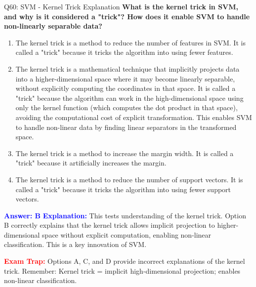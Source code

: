 \documentclass[8pt]{beamer}
\begin{document}
	\begin{frame}{Q60: SVM - Kernel Trick Explanation}
		\fontsize{6.5}{7.5}\selectfont
		\textbf{What is the kernel trick in SVM, and why is it considered a "trick"? How does it enable SVM to handle non-linearly separable data?}
		
		\begin{enumerate}
			\item The kernel trick is a method to reduce the number of features in SVM. It is called a "trick" because it tricks the algorithm into using fewer features.
			\item The kernel trick is a mathematical technique that implicitly projects data into a higher-dimensional space where it may become linearly separable, without explicitly computing the coordinates in that space. It is called a "trick" because the algorithm can work in the high-dimensional space using only the kernel function (which computes the dot product in that space), avoiding the computational cost of explicit transformation. This enables SVM to handle non-linear data by finding linear separators in the transformed space.
			\item The kernel trick is a method to increase the margin width. It is called a "trick" because it artificially increases the margin.
			\item The kernel trick is a method to reduce the number of support vectors. It is called a "trick" because it tricks the algorithm into using fewer support vectors.
		\end{enumerate}
		
		\vspace{0.1cm}
		\textcolor{blue}{\textbf{Answer: B}}
		\vspace{0.1cm}
		\textcolor{blue}{\textbf{Explanation:}} This tests understanding of the kernel trick. Option B correctly explains that the kernel trick allows implicit projection to higher-dimensional space without explicit computation, enabling non-linear classification. This is a key innovation of SVM.
		
		\textcolor{red}{\textbf{Exam Trap:}} Options A, C, and D provide incorrect explanations of the kernel trick. Remember: Kernel trick = implicit high-dimensional projection; enables non-linear classification.
	\end{frame}
	
\end{document}
